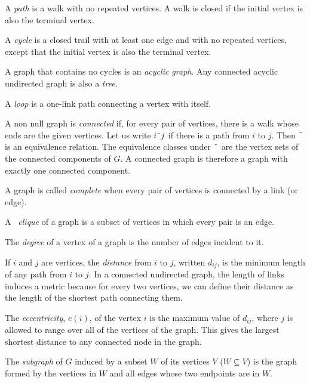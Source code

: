 \documentclass[justified,sixbynine]{tufte-book}
\theoremstyle{plain}%
\theoremstyle{definition}
\theoremstyle{remark}
\begin{document}
\begin{fullwidth}
A {\it path} is a walk with no repeated vertices. A walk is closed if the
initial vertex is also the terminal vertex.

A {\it cycle} is a closed trail with at least one edge and with no repeated
vertices, except that the initial vertex is also the terminal vertex.

A graph that contains no cycles is an {\it acyclic graph}. Any connected
acyclic undirected graph is also a {\it tree}.


A {\it loop} is a one-link path connecting a vertex with itself.


A non null graph is {\it connected} if, for every pair of vertices, there is
a walk whose ends are the given vertices. Let us write $i%
\symbol{126}j$ if there is a path from $i$ to $j$. Then $\symbol{126}$ is an
equivalence relation. The equivalence classes under $\symbol{126}$ are the
vertex sets of the connected components of $G$. A connected graph is therefore
a graph with exactly one connected component.


A graph is called {\it complete} when every pair of vertices is connected by
a link (or edge).


A {\it \ clique } of a graph is a subset of vertices in which every pair is an
edge.


The {\it degree} of a vertex of a graph is the number of edges incident to
it.

If $i$ and $j$ are vertices, the {\it distance} from $i$ to $j$, written $%
d_{ij}$, is the minimum length of any path from $i$ to $j$. In a connected
undirected graph, the length of links induces a metric because for every two vertices, we can define their distance as the length of the shortest path connecting them.

The {\it eccentricity}, $e(i)$, of the vertex $i$ is the maximum value of $%
d_{ij}$, where $j$ is allowed to range over all of the vertices of the graph.  This gives the largest shortest distance to any connected node in the graph.

The {\it subgraph} of $G$ induced by a subset $W$ of its vertices $V$ ($%
W\subseteq V$) is the graph formed by the vertices in $W$ and all edges
whose two endpoints are in $W$.


\end{fullwidth}
\end{document}
